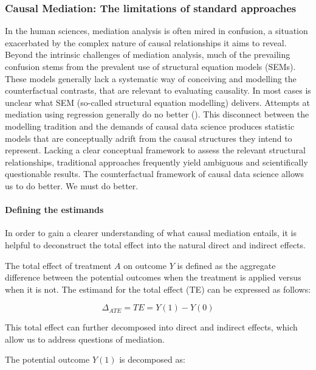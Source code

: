 \documentclass[
  singlecolumn,
  9pt]{article}
\let\oldparagraph\paragraph
\renewcommand{\paragraph}[1]{\oldparagraph{#1}\mbox{}}
\begin{document}
\subsubsection{Causal Mediation: The limitations of standard
approaches}\label{causal-mediation-the-limitations-of-standard-approaches}

In the human sciences, mediation analysis is often mired in confusion, a
situation exacerbated by the complex nature of causal relationships it
aims to reveal. Beyond the intrinsic challenges of mediation analysis,
much of the prevailing confusion stems from the prevalent use of
structural equation models (SEMs). These models generally lack a
systematic way of conceiving and modelling the counterfactual contrasts,
that are relevant to evaluating causality. In most cases is unclear what
SEM (so-called structural equation modelling) delivers. Attempts at
mediation using regression generally do no better
(). This disconnect
between the modelling tradition and the demands of causal data science
produces statistic models that are conceptually adrift from the causal
structures they intend to represent. Lacking a clear conceptual
framework to assess the relevant structural relationships, traditional
approaches frequently yield ambiguous and scientifically questionable
results. The counterfactual framework of causal data science allows us
to do better. We must do better.

\paragraph{Defining the estimands}\label{defining-the-estimands}

In order to gain a clearer understanding of what causal mediation
entails, it is helpful to deconstruct the total effect into the natural
direct and indirect effects.

The total effect of treatment \(A\) on outcome \(Y\) is defined as the
aggregate difference between the potential outcomes when the treatment
is applied versus when it is not. The estimand for the total effect (TE)
can be expressed as follows:

\[
\Delta_{ATE} = TE = Y(1) - Y(0)
\]

This total effect can further decomposed into direct and indirect
effects, which allow us to address questions of mediation.

The potential outcome \(Y(1)\) is decomposed as:
\end{document}
